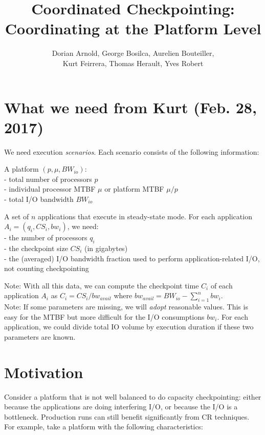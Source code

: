 \documentclass{article}
\author{Dorian Arnold, George Bosilca, Aurelien Bouteiller,\\
 Kurt Feirrera, Thomas Herault, Yves Robert}
\title{Coordinated Checkpointing: Coordinating at the Platform Level}
\begin{document}
\maketitle

\section{What we need from Kurt (Feb. 28, 2017)}

We need execution \emph{scenarios}.
Each scenario consists of the following information:
\begin{compactitem}
\item A platform $(p,\mu, BW_{io})$:\\
- total number of processors $p$\\
- individual processor MTBF $\mu$
or platform MTBF $\mu/p$\\
- total I/O bandwidth $BW_{io}$
\item A set of $n$ applications that execute in steady-state mode. 
For each application $A_{i} = (q_{i}, CS_{i}, bw_{i})$, we need:\\
- the number of processors $q_{i}$\\
- the checkpoint size $CS_{i}$ (in gigabytes)\\
- the (averaged) I/O bandwidth fraction used to perform application-related I/O, 
not counting checkpointing\\
\end{compactitem}

Note: With all this data, we can compute the checkpoint time $C_{i}$
of each application $A_{i}$ as $C_{i} = CS_{i}/bw_{avail}$
where $bw_{avail} = BW_{io} - \sum_{i=1}^{n} bw_{i}$.\\

Note: If some parameters are missing, we will \emph{adopt} reasonable values.
This is easy for the MTBF but more difficult for the I/O consumptions $bw_{i}$.
For each application, we could divide total IO volume by execution duration if 
these two parameters are known.

\section{Motivation}

Consider a platform that is not well balanced to do capacity checkpointing: either because the applications are doing interfering I/O, or because the I/O is a bottleneck. Production runs can still benefit significantly from CR techniques. For example, take a platform with the following characteristics:
\end{document}
